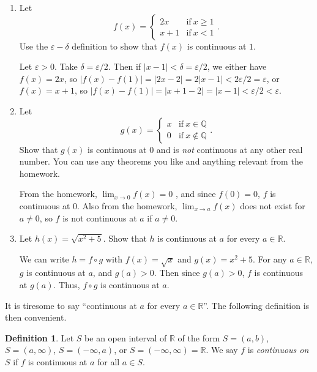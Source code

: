\documentclass[12pt]{amsart}
\def\d{\delta}
\def\e{\varepsilon}
\newcommand{\Q}{\mathbb{Q}}
\newcommand{\R}{{\mathbb{R}}}
\numberwithin{equation}{section}
\theoremstyle{plain} %
\theoremstyle{definition}
\newtheorem{defn}[equation]{Definition}
\theoremstyle{remark}
\begin{document}
\begin{enumerate}
\item Let \[f(x) = \begin{cases} 2x &\text{if} \ x\geq 1 \\ x+1 &\text{if} \ x<1 \end{cases}.\]
 Use the $\e-\delta$ definition to show that $f(x)$ is continuous at $1$.
 
\begin{framed}
Let $\e>0$. Take $\d=\e/2$. Then if $|x-1|<\delta = \e/2$, we either have $f(x) = 2x$, so $|f(x)-f(1)| = |2x-2| = 2 |x-1| < 2\e/2=\e$, or $f(x)=x+1$, so $|f(x)-f(1)| = |x+1-2| =  |x-1| < \e/2<\e$.
\end{framed}
 
\item Let \[g(x) = \begin{cases} x &\text{if} \ x\in \Q \\ 0 &\text{if} \ x\notin \Q \end{cases}.\]
 Show that $g(x)$ is continuous at $0$ and is \emph{not} continuous at any other real number. You can use any theorems you like and anything relevant from the homework.

\begin{framed}
From the homework, $\lim_{x\to 0} f(x) = 0$ , and since $f(0)=0$, $f$ is continuous at $0$. Also from the homework, $\lim_{x\to a} f(x)$ does not exist for $a\neq 0$, so $f$ is not continuous at $a$ if $a\neq 0$.
\end{framed}
 

\item Let $h(x) = \sqrt{ x^2 +5}$. Show that $h$ is continuous at $a$ for every $a\in \R$.

\begin{framed}
We can write $h=f\circ g$ with $f(x)=\sqrt{x}$ and $g(x)=x^2+5$. For any $a\in \R$, $g$ is continuous at $a$, and $g(a) >0$. Then since $g(a)>0$, $f$ is continuous at $g(a)$. Thus, $f\circ g$ is continuous at $a$.
\end{framed}
 \end{enumerate}
 
 
 

\noindent It is tiresome to say ``continuous at $a$ for every $a\in \R$''. The following definition is then convenient.



\begin{defn}  Let $S$ be an open interval of $\R$ of the form $S=(a,b)$, $S=(a,\infty)$, $S=(-\infty,a)$, or $S=(-\infty,\infty)=\R$. We say $f$ is {\em continuous on $S$} if $f$ is continuous at $a$ for all $a\in S$. 
\end{defn}
\end{document}
